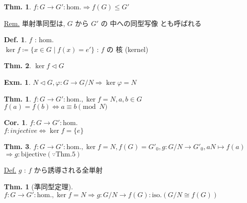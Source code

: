 \documentclass[uplatex,dvipdfmx,9pt]{beamer}
\newcommand{\nsubgroup}{\vartriangleleft} %
\newcounter{textThmCount}
\newcounter{textExmCount}
\theoremstyle{definition} %
\newtheorem{defn}{Def.}[subsection] %
\newtheorem{thm}{Thm.}[subsection] %
\newtheorem{thmText}[textThmCount]{Thm.}
\newtheorem{corText}{Cor.}[textThmCount] %
\theoremstyle{example}
\newtheorem{exmText}[textExmCount]{Exm.}
\begin{document}
      \begin{frame}
        
        \begin{thm}
          $f\colon G \to G' : \text{hom.} \Rightarrow f(G) \le G'$
        \end{thm}
        \underline{Rem.} 単射準同型は, $G$ から $G'$ の \alert{中への同型写像} とも呼ばれる

        \begin{defn}
          $f$ : hom. \\
          $\ker f \coloneqq \{x \in G \mid f(x) = e'\}$ : $f$ の \alert{核} (kernel)
        \end{defn}

        \begin{thm}
          $\ker f \nsubgroup G$
        \end{thm}

        \begin{exmText}
          $N \nsubgroup G, \varphi: G \to G/N \Rightarrow \ker \varphi = N$
        \end{exmText}

      \end{frame}

      \begin{frame}
        
        \begin{thmText}
          $f\colon G \to G' : \text{hom.}, \ker f = N, a,b \in G$ \\
          $f(a) = f(b) \Leftrightarrow a \equiv b \pmod{N}$
        \end{thmText}

        \begin{corText}
          $f\colon G \to G': \text{hom.} $ \\
          $f\colon injective \Leftrightarrow \ker f = \{e\}$
        \end{corText}

        \begin{thm}
          $f\colon G \to G' : \text{hom.}, \ker f = N, f(G) = G'_0, g\colon G/N \to G'_0, aN \mapsto f(a)$ \\
          $\Rightarrow g: \text{bijective} (\because \text{Thm.5})$
        \end{thm}
        \underline{Def.} $g$ : \alert{$f$ から誘導される全単射}


        \begin{thmText}[準同型定理]
          $f\colon G \to G' : \text{hom.}, \ker f = N \Rightarrow g\colon G/N \to f(G): \text{iso.} (G/N \cong f(G))$
        \end{thmText}

      \end{frame}
\end{document}

